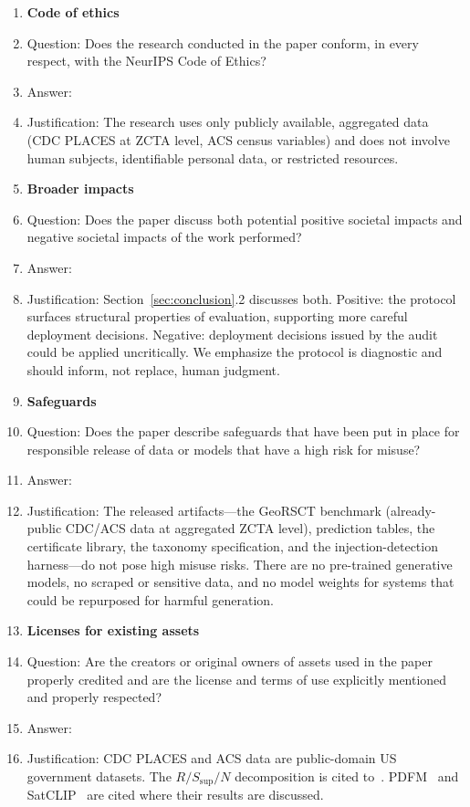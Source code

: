 \begin{enumerate}
\item {\bf Code of ethics}
    \item[] Question: Does the research conducted in the paper conform, in every respect, with the NeurIPS Code of Ethics?
    \item[] Answer: \answerYes{}
    \item[] Justification: The research uses only publicly available, aggregated data (CDC PLACES at ZCTA level, ACS census variables) and does not involve human subjects, identifiable personal data, or restricted resources.

\item {\bf Broader impacts}
    \item[] Question: Does the paper discuss both potential positive societal impacts and negative societal impacts of the work performed?
    \item[] Answer: \answerYes{}
    \item[] Justification: Section~\ref{sec:conclusion}.2 discusses both. Positive: the protocol surfaces structural properties of evaluation, supporting more careful deployment decisions. Negative: deployment decisions issued by the audit could be applied uncritically. We emphasize the protocol is diagnostic and should inform, not replace, human judgment.

\item {\bf Safeguards}
    \item[] Question: Does the paper describe safeguards that have been put in place for responsible release of data or models that have a high risk for misuse?
    \item[] Answer: \answerNA{}
    \item[] Justification: The released artifacts---the GeoRSCT benchmark (already-public CDC/ACS data at aggregated ZCTA level), prediction tables, the certificate library, the taxonomy specification, and the injection-detection harness---do not pose high misuse risks. There are no pre-trained generative models, no scraped or sensitive data, and no model weights for systems that could be repurposed for harmful generation.

\item {\bf Licenses for existing assets}
    \item[] Question: Are the creators or original owners of assets used in the paper properly credited and are the license and terms of use explicitly mentioned and properly respected?
    \item[] Answer: \answerYes{}
    \item[] Justification: CDC PLACES and ACS data are public-domain US government datasets. The $R/S_{\text{sup}}/N$ decomposition is cited to~\citep{martin2026rsct}. PDFM~\citep{agarwal2025pdfm} and SatCLIP~\citep{klemmer2023satclip} are cited where their results are discussed.


\end{enumerate}
